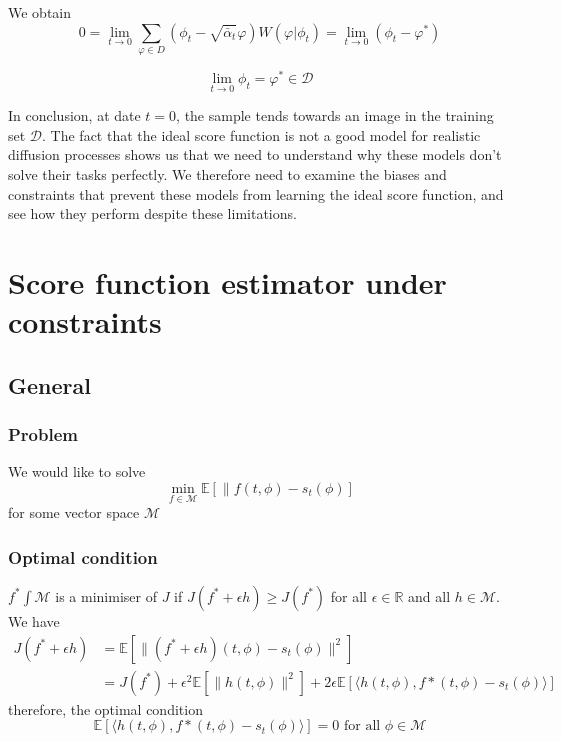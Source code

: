\documentclass[a4paper,10pt]{article}
\theoremstyle{definition} %
\theoremstyle{definition} %
\theoremstyle{definition} %
\theoremstyle{definition} %
\newcommand{\E}[1]{\mathbb{E}\left[#1\right]}
\newcommand{\R}{\mathbb{R}}
\begin{document}
We obtain
\[
0 = \lim\limits_{t \to 0} \sum\limits_{\varphi \in D} (\phi_t - \sqrt{\bar{\alpha}_t} \varphi) W(\varphi | \phi_t) = \lim\limits_{t \to 0} (\phi_t - \varphi^*)
\]


\begin{equation*}
    \lim\limits_{t\rightarrow 0} \phi_t = \varphi^* \in \mathcal{D}
\end{equation*}


In conclusion, at date $t = 0$, the sample tends towards an image in the training set $\mathcal{D}$. The fact that the ideal score function is not a good model for realistic diffusion processes shows us that we need to understand why these models don't solve their tasks perfectly. We therefore need to examine the biases and constraints that prevent these models from learning the ideal score function, and see how they perform despite these limitations.
\section{Score function estimator under constraints}
\subsection{General}
\subsubsection{Problem}
We would like to solve
\begin{equation*}
    \min_{f\in\mathcal{M}} \E{\| f(t,\phi)-s_t(\phi)}
\end{equation*}
for some vector space $\mathcal{M}$
\subsubsection{Optimal condition}
$f^* \int \mathcal{M}$ is a minimiser of $J$ if $J(f^*+\epsilon h) \geq J(f^*)$ for all $\epsilon \in \R$ and all $h\in \mathcal{M}$. We have
\begin{align*}
    J(f^*+\epsilon h) &= \E{\|(f^*+\epsilon h)(t,\phi)-s_t(\phi)\|^2}\\
    & = J(f^*)+\epsilon^2\E{\|h(t,\phi)\|^2}+2\epsilon\E{\langle h(t,\phi),f*(t,\phi) - s_t(\phi) \rangle}
\end{align*}
therefore, the optimal condition
\begin{equation}\label{eq:optimal_condition_score_function}
    \E{\langle h(t,\phi),f*(t,\phi) - s_t(\phi) \rangle} = 0 \text{ for all } \phi \in \mathcal{M}
\end{equation}
\end{document}
